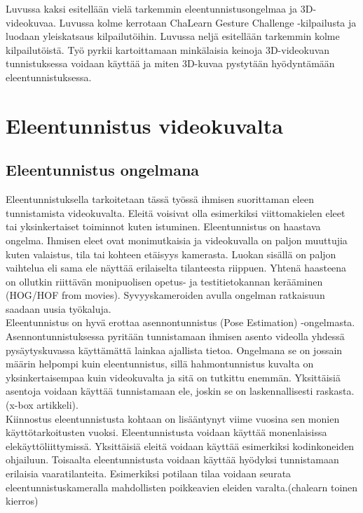 Luvussa kaksi esitellään vielä tarkemmin eleentunnistusongelmaa ja 3D-videokuvaa. Luvussa kolme kerrotaan
ChaLearn Gesture Challenge -kilpailusta ja luodaan yleiskatsaus kilpailutöihin. Luvussa neljä esitellään
tarkemmin kolme kilpailutöistä. Työ pyrkii kartoittamaan minkälaisia keinoja
3D-videokuvan tunnistuksessa voidaan käyttää ja miten 3D-kuvaa pystytään hyödyntämään eleentunnistuksessa.


\section{Eleentunnistus videokuvalta}
\label{eleentunnistus videokuvalta}


\subsection{Eleentunnistus ongelmana}
Eleentunnistuksella tarkoitetaan tässä työssä ihmisen suorittaman eleen tunnistamista videokuvalta. Eleitä voisivat olla esimerkiksi
viittomakielen eleet tai yksinkertaiset toiminnot kuten istuminen. Eleentunnistus on haastava ongelma. Ihmisen eleet ovat
monimutkaisia ja videokuvalla on paljon muuttujia kuten valaistus, tila tai kohteen etäisyys kamerasta.\citep {1251144} Luokan sisällä on paljon vaihtelua eli sama ele näyttää erilaiselta tilanteesta riippuen.
Yhtenä haasteena on ollutkin riittävän monipuolisen opetus- ja testitietokannan kerääminen
(HOG/HOF from movies). Syvyyskameroiden avulla ongelman ratkaisuun saadaan uusia työkaluja.\citep {6239178}\\

Eleentunnistus on hyvä erottaa asennontunnistus (Pose Estimation) -ongelmasta.
Asennontunnistuksessa pyritään tunnistamaan ihmisen asento videolla yhdessä pysäytyskuvassa
käyttämättä lainkaa ajallista tietoa. Ongelmana se on jossain määrin helpompi
kuin eleentunnistus, sillä hahmontunnistus kuvalta on yksinkertaisempaa kuin videokuvalta ja sitä on tutkittu enemmän. 
Yksittäisiä asentoja voidaan käyttää tunnistamaan ele, joskin se on laskennallisesti raskasta. (x-box artikkeli).   \\

Kiinnostus eleentunnistusta kohtaan on lisääntynyt viime vuosina sen monien käyttötarkoitusten vuoksi.
Eleentunnistusta voidaan käyttää monenlaisissa elekäyttöliittymissä. \citep {1251144} Yksittäisiä eleitä voidaan käyttää esimerkiksi kodinkoneiden ohjailuun. Toisaalta eleentunnistusta voidaan käyttää hyödyksi tunnistamaan
erilaisia vaaratilanteita. Esimerkiksi potilaan tilaa voidaan seurata eleentunnistuskameralla mahdollisten poikkeavien eleiden varalta.(chalearn toinen kierros)
\\

